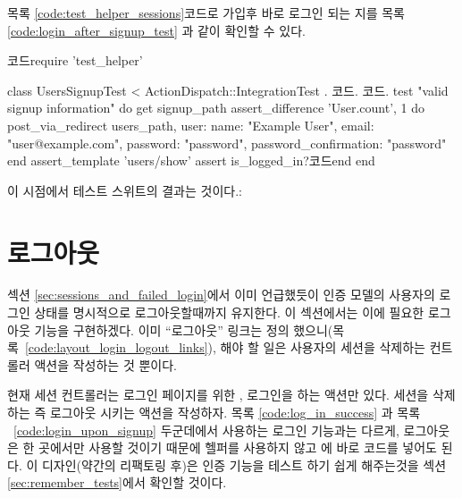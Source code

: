 \noindent 목록 \ref{code:test_helper_sessions}코드로 가입후 바로 로그인 되는 지를 목록\ref{code:login_after_signup_test} 과 같이 확인할 수 있다. 

\begin{codelisting} \label{code:login_after_signup_test}  

\begin{code} 코드require 'test_helper' 

class UsersSignupTest < ActionDispatch::IntegrationTest . 코드. 코드. test "valid signup information" do get signup_path assert_difference 'User.count', 1 do post_via_redirect users_path, user: { name: "Example User", email: "user@example.com", password: "password", password_confirmation: "password" } end assert_template 'users/show' assert is_logged_in?코드end end \end{code} \end{codelisting} 

이 시점에서 테스트 스위트의 결과는  것이다.: 

\begin{codelisting}  

 \end{codelisting} 

\section{로그아웃} \label{sec:logging_out} 

섹션 \ref{sec:sessions_and_failed_login}에서 이미 언급했듯이 인증 모델의 사용자의 로그인 상태를 명시적으로 로그아웃할때까지 유지한다. 이 섹션에서는 이에 필요한 로그아웃 기능을 구현하겠다. 이미 ``로그아웃'' 링크는 정의 했으니(목록~\ref{code:layout_login_logout_links}), 해야 할 일은 사용자의 세션을 삭제하는 컨트롤러 액션을 작성하는 것 뿐이다. 

현재 세션 컨트롤러는 로그인 페이지를 위한 ,  로그인을 하는  액션만 있다. 세션을 삭제하는 즉 로그아웃 시키는   액션을 작성하자. 목록 \ref{code:log_in_success} 과 목록 ~\ref{code:login_upon_signup} 두군데에서 사용하는 로그인 기능과는 다르게, 로그아웃은 한 곳에서만 사용할 것이기 때문에 헬퍼를 사용하지 않고 에 바로 코드를 넣어도 된다. 이 디자인(약간의 리팩토링 후)은 인증 기능을 테스트 하기 쉽게 해주는것을 섹션 \ref{sec:remember_tests}에서 확인할 것이다. 

